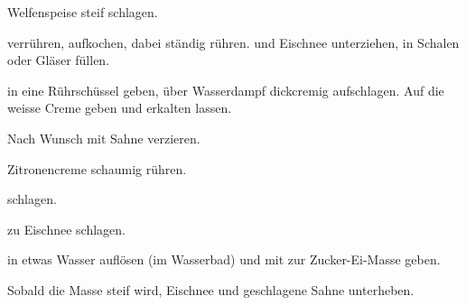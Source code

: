 \begin{recipe}{Welfenspeise}
  steif schlagen.
  
  verrühren, aufkochen, dabei ständig rühren.
  und Eischnee unterziehen, in Schalen oder Gläser füllen.

  in eine Rührschüssel geben, über Wasserdampf dickcremig aufschlagen.
  Auf die weisse Creme geben und erkalten lassen.

  Nach Wunsch mit Sahne verzieren.
\end{recipe}



\begin{recipe}{Zitronencreme}
  schaumig rühren.

  schlagen.
  
  zu Eischnee schlagen.

  in etwas Wasser auflösen (im Wasserbad) und mit
  zur Zucker-Ei-Masse geben.

  Sobald die Masse steif wird, Eischnee und geschlagene Sahne
  unterheben.
\end{recipe}
